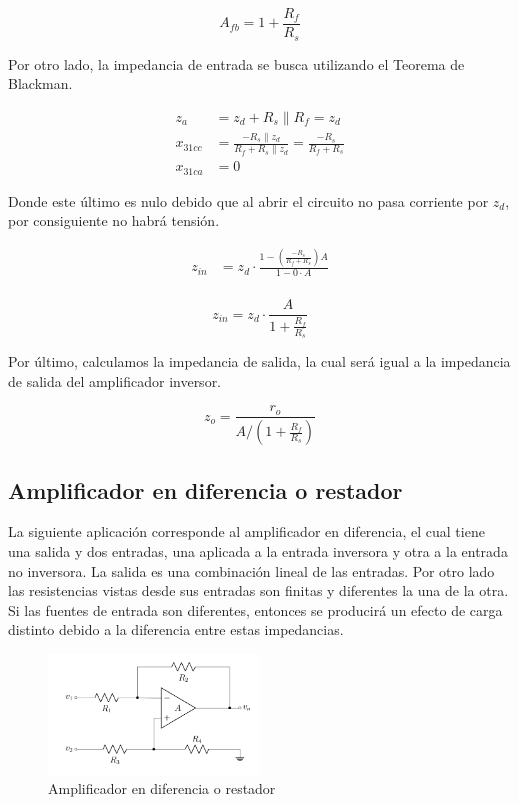 \begin{equation}
    \boxed{A_{fb} = 1 + \frac{R_f}{R_s}}
\end{equation}

Por otro lado, la impedancia de entrada se busca utilizando el Teorema de Blackman.

\begin{align}
z_a &= z_d + R_s \parallel R_f = z_d \\
x_{31cc} &= \frac{-R_s \parallel z_d}{R_f + R_s \parallel z_d} = \frac{-R_s}{R_f + R_s} \\
x_{31ca} &= 0
\end{align}

Donde este último es nulo debido que al abrir el circuito no pasa corriente por $z_d$, por consiguiente no habrá tensión.

\begin{align}
z_{in} &= z_d \cdot \frac{1 - \left( \frac{-R_s}{R_f + R_s} \right) A}{1 - 0 \cdot A} \\
\end{align}

\begin{equation}
    \boxed{z_{in} = z_d \cdot \frac{ A}{1 + \frac{R_f}{R_s}}}
\end{equation}


Por último, calculamos la impedancia de salida, la cual será igual a la
impedancia de salida del amplificador inversor.

\begin{equation}
\boxed{z_o = \frac{r_o}{A / \left( 1 + \frac{R_f}{R_s} \right)}}
\end{equation}


\subsection{Amplificador en diferencia o restador}

La siguiente aplicación corresponde al amplificador en diferencia, el cual
tiene una salida y dos entradas, una aplicada a la entrada inversora y otra a la
entrada no inversora. La salida es una combinación lineal de las entradas. Por
otro lado las resistencias vistas desde sus entradas son finitas y diferentes la
una de la otra. Si las fuentes de entrada son diferentes, entonces se producirá
un efecto de carga distinto debido a la diferencia entre estas impedancias.

\begin{figure}[ht]
    \centering
    \includegraphics[width=0.5\textwidth]{src/images/amp-restador.png}
    \caption{Amplificador en diferencia o restador}
    \label{fig:mt-amp-restador}
\end{figure}

